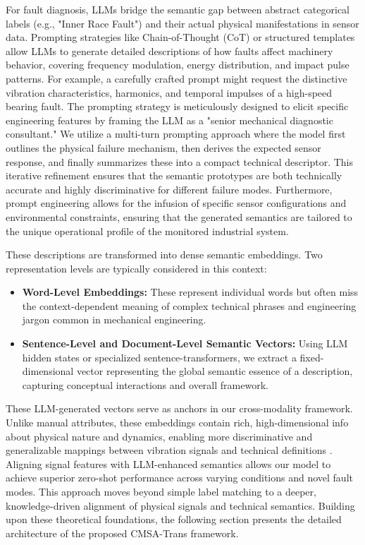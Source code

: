\documentclass[journal]{IEEEtran}
\begin{document}
For fault diagnosis, LLMs bridge the semantic gap between abstract categorical labels (e.g., "Inner Race Fault") and their actual physical manifestations in sensor data. Prompting strategies like Chain-of-Thought (CoT) or structured templates allow LLMs to generate detailed descriptions of how faults affect machinery behavior, covering frequency modulation, energy distribution, and impact pulse patterns. For example, a carefully crafted prompt might request the distinctive vibration characteristics, harmonics, and temporal impulses of a high-speed bearing fault. The prompting strategy is meticulously designed to elicit specific engineering features by framing the LLM as a "senior mechanical diagnostic consultant." We utilize a multi-turn prompting approach where the model first outlines the physical failure mechanism, then derives the expected sensor response, and finally summarizes these into a compact technical descriptor. This iterative refinement ensures that the semantic prototypes are both technically accurate and highly discriminative for different failure modes. Furthermore, prompt engineering allows for the infusion of specific sensor configurations and environmental constraints, ensuring that the generated semantics are tailored to the unique operational profile of the monitored industrial system.

These descriptions are transformed into dense semantic embeddings. Two representation levels are typically considered in this context:
\begin{itemize}
    \item \textbf{Word-Level Embeddings:} These represent individual words but often miss the context-dependent meaning of complex technical phrases and engineering jargon common in mechanical engineering.
    \item \textbf{Sentence-Level and Document-Level Semantic Vectors:} Using LLM hidden states or specialized sentence-transformers, we extract a fixed-dimensional vector representing the global semantic essence of a description, capturing conceptual interactions and overall framework.
\end{itemize}
These LLM-generated vectors serve as anchors in our cross-modality framework. Unlike manual attributes, these embeddings contain rich, high-dimensional info about physical nature and dynamics, enabling more discriminative and generalizable mappings between vibration signals and technical definitions \cite{brown2020language, devlin2018bert, industrial_llm_ref}. Aligning signal features with LLM-enhanced semantics allows our model to achieve superior zero-shot performance across varying conditions and novel fault modes. This approach moves beyond simple label matching to a deeper, knowledge-driven alignment of physical signals and technical semantics. Building upon these theoretical foundations, the following section presents the detailed architecture of the proposed CMSA-Trans framework.
\end{document}
